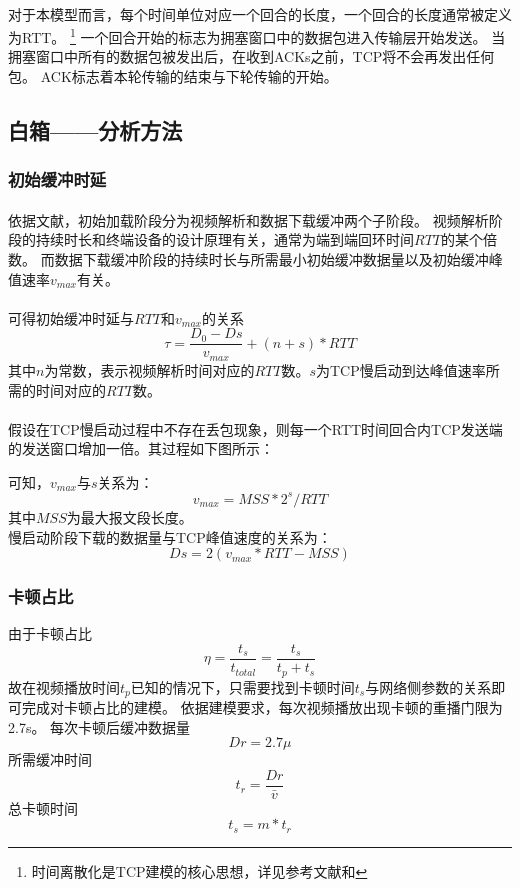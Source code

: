 \documentclass[UTF8]{ctexart}
\begin{document}
\paragraph{}
对于本模型而言，每个时间单位对应一个回合的长度，一个回合的长度通常被定义为RTT。
\footnote{时间离散化是TCP建模的核心思想，详见参考文献\cite{}\cite{}和}
一个回合开始的标志为拥塞窗口中的数据包进入传输层开始发送。
当拥塞窗口中所有的数据包被发出后，在收到ACKs之前，TCP将不会再发出任何包。
ACK标志着本轮传输的结束与下轮传输的开始。

\subsection{白箱——分析方法}
\subsubsection{初始缓冲时延}
\paragraph{}
依据文献\cite{}，初始加载阶段分为视频解析和数据下载缓冲两个子阶段。
视频解析阶段的持续时长和终端设备的设计原理有关，通常为端到端回环时间$RTT$的某个倍数。
而数据下载缓冲阶段的持续时长与所需最小初始缓冲数据量以及初始缓冲峰值速率$v_{max}$有关。
\paragraph{}可得初始缓冲时延与$RTT$和$v_{max}$的关系
\begin{equation}
    \tau = \frac{D_{0}-Ds}{v_{max}} + (n+s)*RTT
\end{equation}
其中$n$为常数，表示视频解析时间对应的$RTT$数。$s$为TCP慢启动到达峰值速率所需的时间对应的$RTT$数。

\paragraph{}
假设在TCP慢启动过程中不存在丢包现象，则每一个RTT时间回合内TCP发送端的发送窗口增加一倍。其过程如下图所示：


可知，$v_{max}$与$s$关系为：
\[v_{max}=MSS*2^{s}/RTT\]
其中$MSS$为最大报文段长度。
\\
慢启动阶段下载的数据量与TCP峰值速度的关系为：
\[Ds= 2(v_{max}*RTT-MSS)\]
\subsubsection{卡顿占比}
由于卡顿占比
\[\eta=\frac{t_{s}}{t_{total}}=\frac{t_{s}}{t_{p}+t_{s}}\]
故在视频播放时间$t_{p}$已知的情况下，只需要找到卡顿时间$t_{s}$与网络侧参数的关系即可完成对卡顿占比的建模。
依据建模要求，每次视频播放出现卡顿的重播门限为2.7s。
每次卡顿后缓冲数据量
\[Dr=2.7\mu\]
所需缓冲时间
\[t_{r}=\frac{Dr}{\bar{v}}\]
总卡顿时间\[t_{s}=m*t_{r}\]
\end{document}
